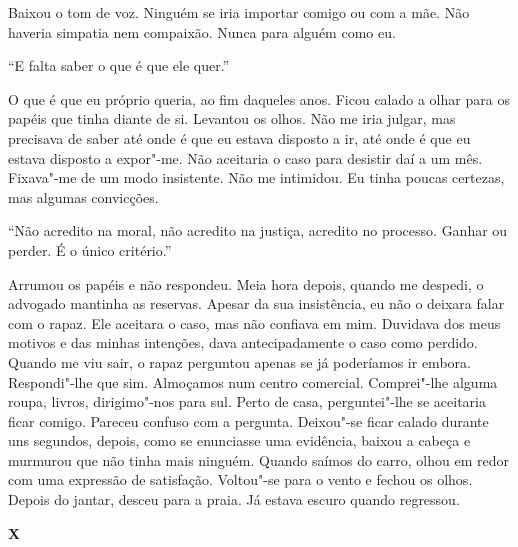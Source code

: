 Baixou o tom de voz. Ninguém se iria importar comigo ou com a mãe. Não
haveria simpatia nem compaixão. Nunca para alguém como eu.

``E falta saber o que é que ele quer.''

O que é que eu próprio queria, ao fim daqueles anos. Ficou calado a
olhar para os papéis que tinha diante de si. Levantou os olhos. Não me
iria julgar, mas precisava de saber até onde é que eu estava disposto a
ir, até onde é que eu estava disposto a expor"-me. Não aceitaria o caso
para desistir daí a um mês. Fixava"-me de um modo insistente. Não me
intimidou. Eu tinha poucas certezas, mas algumas convicções.

``Não acredito na moral, não acredito na justiça, acredito no processo.
Ganhar ou perder. É o único critério.''

Arrumou os papéis e não respondeu. Meia hora depois, quando me despedi,
o advogado mantinha as reservas. Apesar da sua insistência, eu não o
deixara falar com o rapaz. Ele aceitara o caso, mas não confiava em mim.
Duvidava dos meus motivos e das minhas intenções, dava antecipadamente o
caso como perdido. Quando me viu sair, o rapaz perguntou apenas se já
poderíamos ir embora. Respondi"-lhe que sim. Almoçamos num centro
comercial. Comprei"-lhe alguma roupa, livros, dirigimo"-nos para sul.
Perto de casa, perguntei"-lhe se aceitaria ficar comigo. Pareceu confuso
com a pergunta. Deixou"-se ficar calado durante uns segundos, depois,
como se enunciasse uma evidência, baixou a cabeça e murmurou que não
tinha mais ninguém. Quando saímos do carro, olhou em redor com uma
expressão de satisfação. Voltou"-se para o vento e fechou os olhos.
Depois do jantar, desceu para a praia. Já estava escuro quando
regressou.

\vspace*{1.8cm}
\noindent{}\textbf{X}

\bigskip


